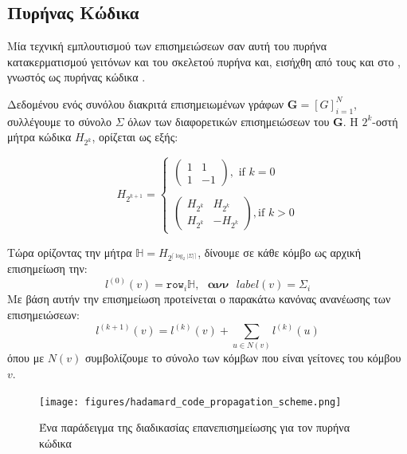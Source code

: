\subsection{Πυρήνας Κώδικα }
Μία τεχνική εμπλουτισμού των επισημειώσεων σαν αυτή του πυρήνα κατακερματισμού γειτόνων και του σκελετού πυρήνα  και, εισήχθη από τους  και  στο \cite{Kataoka}, γνωστός ως πυρήνας κώδικα .\par
Δεδομένου ενός συνόλου διακριτά επισημειωμένων γράφων $\mathbf{G}=[G]^{N}_{i=1}$, συλλέγουμε το σύνολο $\Sigma$ όλων των διαφορετικών επισημειώσεων του $\mathbf{G}$.
Η $2^{k}$-οστή μήτρα κώδικα  $H_{2^{k}}$, ορίζεται ως εξής:

\begin{equation}
H_{2^{k+1}}= \begin{cases}
\begin{pmatrix}
    1 & 1\\
    1 & -1
\end{pmatrix},\text{ if }k = 0
\\\\
\begin{pmatrix}
    H_{2^{k}} & H_{2^{k}}\\
    H_{2^{k}} & -H_{2^{k}}
\end{pmatrix},\text{if } k > 0
\end{cases}
\end{equation}

Τώρα ορίζοντας την μήτρα  $\mathbb{H} = H_{2^{\lceil \log_{2}|\Sigma|\rceil}}$, δίνουμε σε κάθε κόμβο ως αρχική επισημείωση την:
\begin{equation}
l^{(0)}(v) = \mathtt{row}_{i}\mathbb{H},\text{ }\textbf{ανν}\text{ }label(v) = \Sigma_{i}
\end{equation}
Με βάση αυτήν την επισημείωση προτείνεται ο παρακάτω κανόνας ανανέωσης των επισημειώσεων:
\begin{equation}
l^{(k+1)}(v) = l^{(k)}(v) + \sum_{u \in N(v)}l^{(k)}(u)
\end{equation}
όπου με $N(v)$ συμβολίζουμε το σύνολο των κόμβων που είναι γείτονες του κόμβου $v$.

\begin{figure}[]
\centering
\texttt{[image: figures/hadamard\_code\_propagation\_scheme.png]}
\caption{Ένα παράδειγμα της διαδικασίας επανεπισημείωσης για τον πυρήνα κώδικα }
\label{fig:hd_ps}
\end{figure}

